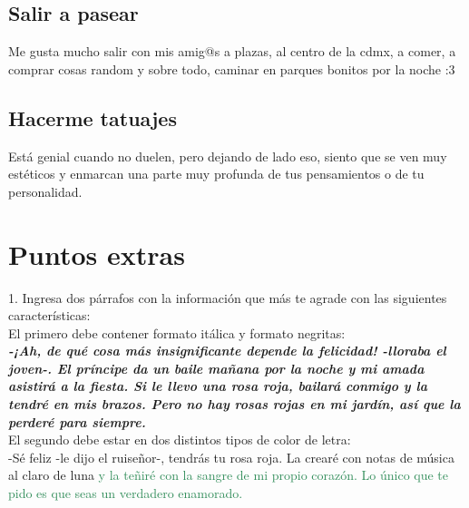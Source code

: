 \documentclass[letterpaper, 12pt]{article}
\begin{document}
    \subsection{\large{Salir a pasear}}
        \normalsize{Me gusta mucho salir con mis amig@s a plazas, al centro de la cdmx, a comer, a comprar cosas random y sobre todo, caminar en parques bonitos por la noche :3}
    \subsection{\large{Hacerme tatuajes}}
        \normalsize{Está genial cuando no duelen, pero dejando de lado eso, siento que se ven muy estéticos y enmarcan una parte muy profunda de tus pensamientos o de tu personalidad.}
    
    
\section*{Puntos extras}
1. Ingresa dos párrafos con la información que más te agrade con las siguientes características:\\


El primero debe contener formato itálica y formato negritas:\\ 
    \textit{ \textbf{ -¡Ah, de qué cosa más insignificante depende la felicidad! -lloraba el joven-. El príncipe da un baile mañana por la noche y mi amada asistirá a la fiesta. Si le llevo una rosa roja, bailará conmigo y la tendré en mis brazos. Pero no hay rosas rojas en mi jardín, así que la perderé para siempre.}}\\ 
    
El segundo debe estar en dos distintos tipos de color de letra:\\
    \textcolor{BrickRed}{-Sé feliz -le dijo el ruiseñor-, tendrás tu rosa roja. La crearé con notas de música al claro de luna} \textcolor{SeaGreen}{y la teñiré con la sangre de mi propio corazón. Lo único que te pido es que seas un verdadero enamorado.}
 
        
    
\end{document}
